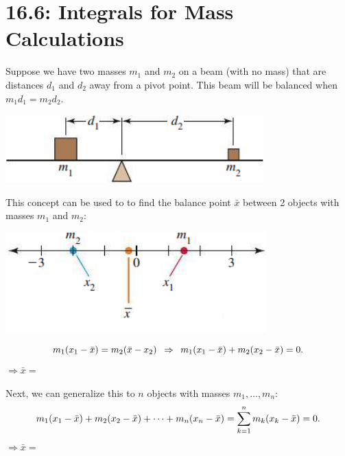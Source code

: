 \documentclass[mathNotesPreamble]{subfiles}
\begin{document}
\section{16.6: Integrals for Mass Calculations}
  Suppose we have two masses $m_1$ and $m_2$ on a beam (with no mass) that are distances $d_1$ and $d_2$ away from a pivot point. This beam will be balanced when $m_1d_1=m_2d_2$.
  \vspace*{10pt}
  \begin{center}
    \includegraphics[width=0.45\linewidth]{images/briggs_16_06/fig16_64}
  \end{center}
  \vspace*{10pt}
  This concept can be used to to find the balance point $\bar{x}$ between 2 objects with masses $m_1$ and $m_2$:
  \begin{center}
    \includegraphics[width=0.45\linewidth]{images/briggs_16_06/fig16_65}
  \end{center}
  \[m_1{\left(x_1-\bar{x}\right)}=m_2{\left(\bar{x}-x_2\right)}\hspace*{5pt} \Rightarrow \hspace*{5pt} m_1{\left(x_1-\bar{x}\right)}+m_2{\left(x_2-\bar{x}\right)}=0.\]
  \tab$\Rightarrow \bar{x}=$

  Next, we can generalize this to $n$ objects with masses $m_1,\dots,m_n$:
    \[m_1{\left(x_1-\bar{x}\right)}+m_2{\left(x_2-\bar{x}\right)}+\dots+m_n{\left(x_n-\bar{x}\right)}=\sum_{k=1}^n m_k{\left(x_k-\bar{x}\right)}=0.\]
  \tab$\Rightarrow \bar{x}=$
  \pagebreak
\end{document}
